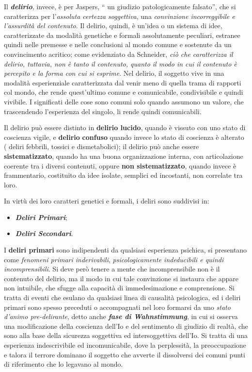 \documentclass[]{article}
\begin{document}
Il \textbf{\emph{delirio}}, invece, è per Jaspers, `` un giudizio
patologicamente falsato'', che si caratterizza per l'\emph{assoluta
certezza soggettiva}, una \emph{convinzione incorreggibile e l'assurdità
del contenuto}. Il delirio, quindi, è un'idea o un sistema di idee,
caratterizzate da modalità genetiche e formali assolutamente peculiari,
estranee quindi nelle premesse e nelle conclusioni al mondo comune e
sostenute da un convincimento acritico; come evidenziato da Schneider,
\emph{ciò che caratterizza il delirio, tuttavia, non è tanto il
contenuto, quanto il modo in cui il contenuto è percepito e la forma con
cui si esprime}. Nel delirio, il soggetto vive in una modalità
esperienziale caratterizzata dal venir meno di quella trama di rapporti
col mondo, che rende quest'ultimo comune e comunicabile, condivisibile e
quindi vivibile. I significati delle cose sono comuni solo quando
assumono un valore, che trascendendo l'esperienza del singolo, li rende
quindi comunicabili.

Il delirio può essere distinto in \textbf{delirio lucido}, quando è
vissuto con uno stato di coscienza vigile, e \textbf{delirio}
\textbf{confuso} quando invece lo stato di coscienza è alterato ( deliri
febbrili, tossici e dismetabolici); il delirio può anche essere
\textbf{sistematizzato}, quando ha una buona organizzazione interna, con
articolazione coerente tra i diversi contenuti, oppure \textbf{non
sistematizzato}, quando invece è frammentario, costituito da idee
isolate, semplici ed incostanti, non correlate tra loro.

In virtù dei loro caratteri genetici e formali, i deliri sono suddivisi
in:

\begin{itemize}
\item
  \textbf{\emph{Deliri Primari}};
\item
  \textbf{\emph{Deliri Secondari}}.
\end{itemize}

I \textbf{deliri primari} sono indipendenti da qualsiasi esperienza
psichica, si presentano come \emph{fenomeni primari inderivabili},
\emph{psicologicamente indeducibili e quindi incomprensibili}. Si deve
però tenere a mente che incomprensibile non è il contenuto del delirio,
ma il modo in cui tale convinzione si instaura che appare non intuibile,
che sfugge alla capacità di immedesimazione e comprensione. Si tratta di
eventi che esulano da qualsiasi linea di causalità psicologica, ed i
deliri primari sono spesso preceduti o accompagnati nel loro formarsi da
uno \emph{stato d'animo pre-delirante}, detto anche \textbf{\emph{fase
di Wahnstimmung}}, in cui si osserva una modificazione della coscienza
dell'Io e del sentimento di giudizio di realtà, che sono alla base della
sicurezza soggettiva ed intersoggettiva dell'Io. Si tratta di una
esperienza indescrivibile ed incomunicabile, dove la perplessità, la
preoccupazione e talora il terrore dominano il soggetto che avverte il
dissolversi dei comuni punti di riferimento che lo legavano al mondo.
\end{document}
